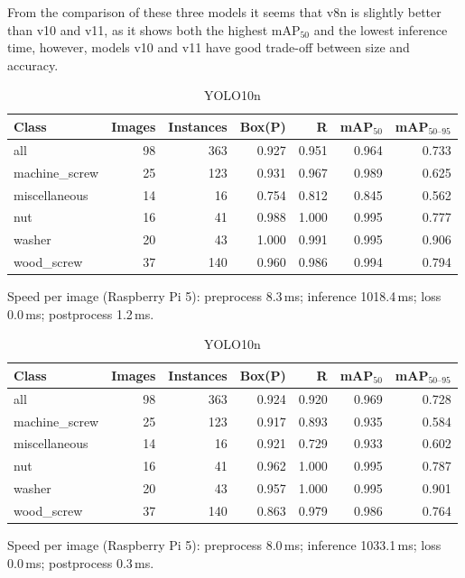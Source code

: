 \documentclass[12pt,a4paper]{report}
\begin{document}
From the comparison of these three models it seems that v8n is slightly better than
v10 and v11, as it shows both the highest mAP$_{50}$ and the lowest inference time,
however, models v10 and v11 have good trade-off between size and accuracy. \\


\begin{table}[!t]
\centering
\caption{Validation summaries.}
\label{tab:val_summaries}
\begin{subtable}{\linewidth}
  \centering
  \caption{YOLO8n \cite{yolov8_ultralytics}}
  \begin{tabular}{lrrrrrr}
  \hline
  Class & Images & Instances & Box(P) & R & mAP$_{50}$ & mAP$_{50\mbox{--}95}$ \\
  \hline
  all            & 98 & 363 & 0.927 & 0.951 & 0.964 & 0.733 \\
  machine\_screw & 25 & 123 & 0.931 & 0.967 & 0.989 & 0.625 \\
  miscellaneous  & 14 &  16 & 0.754 & 0.812 & 0.845 & 0.562 \\
  nut            & 16 &  41 & 0.988 & 1.000 & 0.995 & 0.777 \\
  washer         & 20 &  43 & 1.000 & 0.991 & 0.995 & 0.906 \\
  wood\_screw    & 37 & 140 & 0.960 & 0.986 & 0.994 & 0.794 \\
  \hline
  \end{tabular}
  \par\smallskip
  \small Speed per image (Raspberry Pi 5): preprocess 8.3\,ms; inference 1018.4\,ms; loss 0.0\,ms; postprocess 1.2\,ms.
\end{subtable}

\medskip

\begin{subtable}{\linewidth}
  \centering
  \caption{YOLO10n}
  \begin{tabular}{lrrrrrr}
  \hline
  Class & Images & Instances & Box(P) & R & mAP$_{50}$ & mAP$_{50\mbox{--}95}$ \\
  \hline
  all            & 98 & 363 & 0.924 & 0.920 & 0.969 & 0.728 \\
  machine\_screw & 25 & 123 & 0.917 & 0.893 & 0.935 & 0.584 \\
  miscellaneous  & 14 &  16 & 0.921 & 0.729 & 0.933 & 0.602 \\
  nut            & 16 &  41 & 0.962 & 1.000 & 0.995 & 0.787 \\
  washer         & 20 &  43 & 0.957 & 1.000 & 0.995 & 0.901 \\
  wood\_screw    & 37 & 140 & 0.863 & 0.979 & 0.986 & 0.764 \\
  \hline
  \end{tabular}
  \par\smallskip
  \small Speed per image (Raspberry Pi 5): preprocess 8.0\,ms; inference 1033.1\,ms; loss 0.0\,ms; postprocess 0.3\,ms.
\end{subtable}


\end{table}
\end{document}
